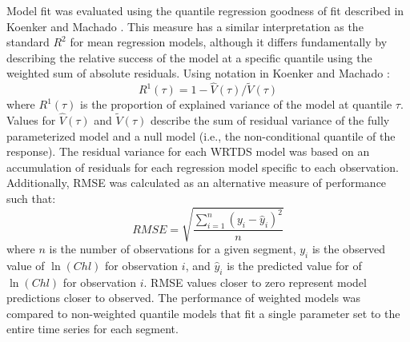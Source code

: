 \documentclass{svjour3}\usepackage[]{graphicx}\usepackage[]{color}
\begin{document}
Model fit was evaluated using the quantile regression goodness of fit described in Koenker and Machado \cite{Koenker99}.  This measure has a similar interpretation as the standard $R^2$ for mean regression models, although it differs fundamentally by describing the relative success of the model at a specific quantile using the weighted sum of absolute residuals. Using notation in Koenker and Machado \cite{Koenker99}:
\begin{equation}
R^1\left(\tau\right) = 1 - \hat{V}\left(\tau\right)/\tilde{V}\left(\tau\right)
\end{equation}
\noindent where $R^1\left(\tau\right)$ is the proportion of explained variance of the model at quantile $\tau$.  Values for $\hat{V}\left(\tau\right)$ and $\tilde{V}\left(\tau\right)$ describe the sum of residual variance of the fully parameterized model and a null model (i.e., the non-conditional quantile of the response).  The residual variance for each \ac{WRTDS} model was based on an accumulation of residuals for each regression model specific to each observation.  Additionally, \ac{RMSE} was calculated as an alternative measure of performance such that:
\begin{equation}
RMSE = \sqrt {{\frac{{\sum\limits_{{i = 1}}^n {{{\left( {{y_i} - {{\hat{y}}_i}} \right)}^2}} }}{{n}}}}
\end{equation}
\noindent where $n$ is the number of observations for a given segment, $y_i$ is the observed value of $\ln\left(Chl\right)$ for observation $i$, and ${\hat{y}}_i$ is the predicted value for of $\ln\left(Chl\right)$ for observation $i$.  \ac{RMSE} values closer to zero represent model predictions closer to observed. The performance of weighted models was compared to non-weighted quantile models that fit a single parameter set to the entire time series for each segment.
\end{document}
